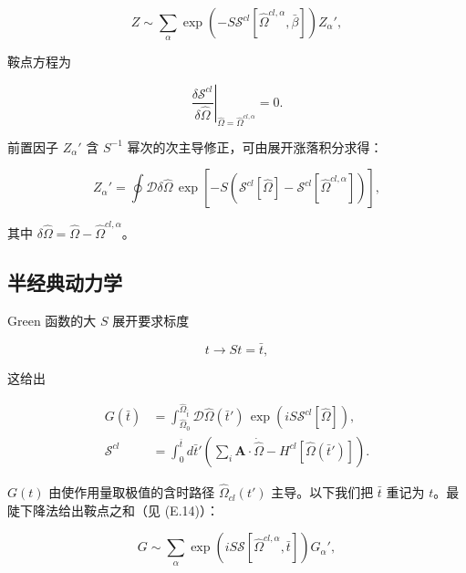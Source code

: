 \begin{equation*}
Z \sim \sum_ {\alpha} \exp \left( - S \mathcal {S} ^ {cl} [ \hat {\Omega} ^ {cl, \alpha}, \bar {\beta} ] \right) Z _ {\alpha} ' ,
\tag{10.26}
\end{equation*}

鞍点方程为

\begin{equation*}
\left. \frac {\delta \mathcal {S} ^ {cl}}{\delta \hat {\Omega}} \right| _ {\hat {\Omega} = \hat {\Omega} ^ {cl, \alpha}} = 0.
\tag{10.27}
\end{equation*}

前置因子 $Z_{\alpha}'$ 含 $S^{-1}$ 幂次的次主导修正，可由展开涨落积分求得：

\begin{equation*}
Z _ {\alpha} ' = \oint \mathcal {D} \delta \hat {\Omega} \, \exp \left[ - S \left( \mathcal {S} ^ {cl} [ \hat {\Omega} ] - \mathcal {S} ^ {cl} [ \hat {\Omega} ^ {cl, \alpha} ] \right) \right] ,
\tag{10.28}
\end{equation*}

其中 $\delta \hat{\Omega} = \hat{\Omega} - \hat{\Omega}^{cl,\alpha}$。

\subsection{半经典动力学}

Green 函数的大 $S$ 展开要求标度

\begin{equation*}
t \rightarrow S t = \bar {t} ,
\tag{10.29}
\end{equation*}

这给出

\begin{align*}
G ( \bar {t} ) & = \int_{\hat {\Omega} _ {0}} ^ {\hat {\Omega} _ {\bar {t}}} \mathcal {D} \hat {\Omega} ( \bar {t} ' ) \, \exp \left( i S \mathcal {S} ^ {cl} [ \hat {\Omega} ] \right) ,\\
\mathcal {S} ^ {cl} & = \int_ {0} ^ {\bar {t}} d \bar {t} ' \left( \sum_ {i} \mathbf {A} \cdot \dot {\hat {\Omega}} - H ^ {cl} [ \hat {\Omega} ( \bar {t} ' ) ] \right) .
\tag{10.30}
\end{align*}

$G(t)$ 由使作用量取极值的含时路径 $\hat{\Omega}_{cl}(t')$ 主导。以下我们把 $\bar{t}$ 重记为 $t$。最陡下降法给出鞍点之和（见 (E.14)）：

\begin{equation*}
G \sim \sum_ {\alpha} \exp \left( i S \mathcal {S} [ \hat {\Omega} ^ {cl, \alpha}, \bar {t} ] \right) G _ {\alpha} ' ,
\tag{10.31}
\end{equation*}

